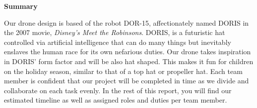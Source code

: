 \begin{center}
\textbf{Summary}
\end{center}
Our drone design is based of the robot DOR-15, affectionately named DORIS in the 2007 movie, \textit{Disney's Meet the Robinsons}. DORIS, is a futuristic hat controlled via artificial intelligence that can do many things but inevitably enslaves the human race for its own nefarious duties. Our drone takes inspiration in DORIS' form factor and will be also hat shaped. This makes it fun for children on the holiday season, similar to that of a top hat or propeller hat. Each team member is confident that our project will be completed in time as we divide and collaborate on each task evenly. In the rest of this report, you will find our estimated timeline as well as assigned roles and duties per team member.\par
